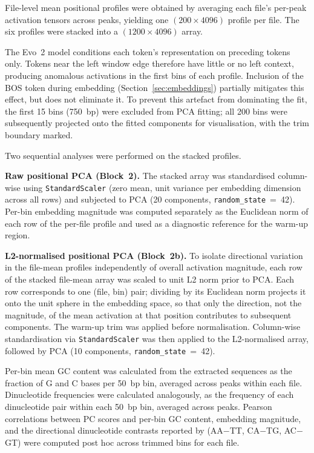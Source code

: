 File-level mean positional profiles were obtained by averaging each file's per-peak activation tensors across peaks, yielding one $(200 \times 4096)$ profile per file.
The six profiles were stacked into a $(1200 \times 4096)$ array.

The Evo~2 model conditions each token's representation on preceding tokens only.
Tokens near the left window edge therefore have little or no left context, producing anomalous activations in the first bins of each profile.
Inclusion of the BOS token during embedding (Section~\ref{sec:embeddings}) partially mitigates this effect, but does not eliminate it.
To prevent this artefact from dominating the fit, the first 15 bins (750~bp) were excluded from PCA fitting; all 200 bins were subsequently projected onto the fitted components for visualisation, with the trim boundary marked.

Two sequential analyses were performed on the stacked profiles.

\textbf{Raw positional PCA (Block~2).}
The stacked array was standardised column-wise using \texttt{StandardScaler} \cite{pedregosaScikitlearnMachineLearning2011} (zero mean, unit variance per embedding dimension across all rows) and subjected to PCA (20 components, \texttt{random\_state}~=~42).
Per-bin embedding magnitude was computed separately as the Euclidean norm of each row of the per-file profile and used as a diagnostic reference for the warm-up region.

\textbf{L2-normalised positional PCA (Block~2b).}
To isolate directional variation in the file-mean profiles independently of overall activation magnitude, each row of the stacked file-mean array was scaled to unit L2 norm prior to PCA.
Each row corresponds to one (file, bin) pair; dividing by its Euclidean norm projects it onto the unit sphere in the embedding space, so that only the direction, not the magnitude, of the mean activation at that position contributes to subsequent components.
The warm-up trim was applied before normalisation.
Column-wise standardisation via \texttt{StandardScaler} was then applied to the L2-normalised array, followed by PCA (10 components, \texttt{random\_state}~=~42).

Per-bin mean GC content was calculated from the extracted sequences as the fraction of G and C bases per 50~bp bin, averaged across peaks within each file.
Dinucleotide frequencies were calculated analogously, as the frequency of each dinucleotide pair within each 50~bp bin, averaged across peaks.
Pearson correlations between PC scores and per-bin GC content, embedding magnitude, and the directional dinucleotide contrasts reported by \citet{faltejskovaNonconsensusFlankingSequence2026a} (AA$-$TT, CA$-$TG, AC$-$GT) were computed post hoc across trimmed bins for each file.

